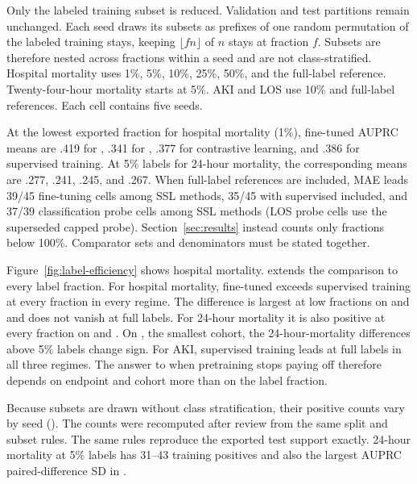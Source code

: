 Only the labeled training subset is reduced. Validation and test partitions remain unchanged. Each seed draws its subsets as prefixes of one random permutation of the labeled training stays, keeping $\lfloor fn \rfloor$ of $n$ stays at fraction $f$. Subsets are therefore nested across fractions within a seed and are not class-stratified. Hospital mortality uses 1\%, 5\%, 10\%, 25\%, 50\%, and the full-label reference. Twenty-four-hour mortality starts at 5\%. AKI and LOS use 10\% and full-label references. Each cell contains five seeds.


At the lowest exported fraction for \Combined{} hospital mortality (1\%), fine-tuned AUPRC means are .419 for \MAE{}, .341 for \JEPA{}, .377 for contrastive learning, and .386 for supervised training. At 5\% labels for 24-hour mortality, the corresponding means are .277, .241, .245, and .267. When full-label references are included, MAE leads 39/45 fine-tuning cells among SSL methods, 35/45 with supervised included, and 37/39 classification probe cells among SSL methods (LOS probe cells use the superseded capped probe). Section~\ref{sec:results} instead counts only fractions below 100\%. Comparator sets and denominators must be stated together.

\begin{table}[htbp]
{\scriptsize}
\end{table}

Figure~\ref{fig:label-efficiency} shows hospital mortality.  extends the comparison to every label fraction. For hospital mortality, fine-tuned \MAE{} exceeds supervised training at every fraction in every regime. The difference is largest at low fractions on \Combined{} and \EICU{} and does not vanish at full labels. For 24-hour mortality it is also positive at every fraction on \EICU{} and \Combined{}. On \MIMIC{}, the smallest cohort, the 24-hour-mortality differences above 5\% labels change sign. For AKI, supervised training leads at full labels in all three regimes. The answer to when pretraining stops paying off therefore depends on endpoint and cohort more than on the label fraction.

Because subsets are drawn without class stratification, their positive counts vary by seed (). The counts were recomputed after review from the same split and subset rules. The same rules reproduce the exported test support exactly. \MIMIC{} 24-hour mortality at 5\% labels has 31--43 training positives and also the largest AUPRC paired-difference SD in .


